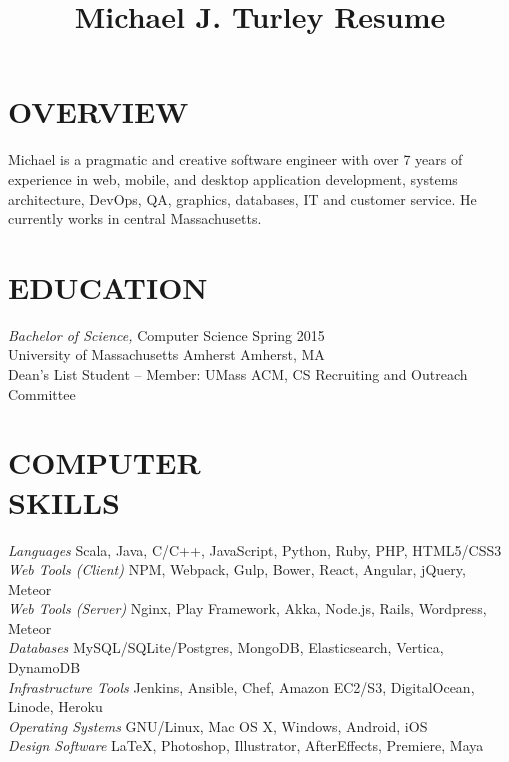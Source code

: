 \documentclass[line,margin]{res}
\begin{document}
\title{Michael J. Turley Resume}

\address{208 Prospect St, Athol, MA 01331}
\address{781-264-6283  |  mike@miketurley.com | github.com/mturley}

\begin{resume}

\section{OVERVIEW}
    Michael is a pragmatic and creative software engineer with over 7 years of experience in web, mobile, and desktop application development, systems architecture, DevOps, QA, graphics, databases, IT and customer service.  He currently works in central Massachusetts.

\section{EDUCATION}
    {\sl Bachelor of Science,} Computer Science \hfill Spring 2015 \\
    University of Massachusetts Amherst \hfill Amherst, MA \\
    Dean's List Student -- Member: UMass ACM, CS Recruiting and Outreach Committee


\section{COMPUTER \\ SKILLS}
    {\sl Languages} \hfill Scala, Java, C/C++, JavaScript, Python, Ruby, PHP, HTML5/CSS3 \\
    {\sl Web Tools (Client)} \hfill NPM, Webpack, Gulp, Bower, React, Angular, jQuery, Meteor \\
    {\sl Web Tools (Server)} \hfill Nginx, Play Framework, Akka, Node.js, Rails, Wordpress, Meteor \\
    {\sl Databases} \hfill MySQL/SQLite/Postgres, MongoDB, Elasticsearch, Vertica, DynamoDB \\
    {\sl Infrastructure Tools} \hfill Jenkins, Ansible, Chef, Amazon EC2/S3, DigitalOcean, Linode, Heroku \\
    {\sl Operating Systems} \hfill GNU/Linux, Mac OS X, Windows, Android, iOS \\
    {\sl Design Software} \hfill \LaTeX, Photoshop, Illustrator, AfterEffects, Premiere, Maya


\end{resume}
\end{document}

